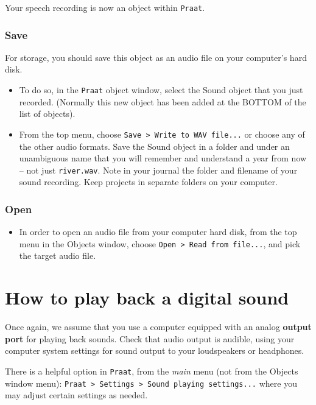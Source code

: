 \documentclass[
]{book}
\providecommand{\tightlist}{%
  \setlength{\itemsep}{0pt}\setlength{\parskip}{0pt}}
\begin{document}
Your speech recording is now an object within \texttt{Praat}.

\subsubsection{Save}\label{sec:praatsave}

For storage, you should save this object as an audio file on your computer's hard disk.

\begin{itemize}
\item
  To do so, in the \texttt{Praat} object window, select the Sound object that you just recorded. (Normally this new object has been added at the BOTTOM of the list of objects).
\item
  From the top menu, choose \texttt{Save\ \textgreater{}\ Write\ to\ WAV\ file...} or choose any of the other audio formats. Save the Sound object in a folder and under an unambiguous name that you will remember and understand a year from now -- not just \texttt{river.wav}. Note in your journal the folder and filename of your sound recording. Keep projects in separate folders on your computer.
\end{itemize}

\subsubsection{Open}\label{sec:praatopen}

\begin{itemize}
\tightlist
\item
  In order to open an audio file from your computer hard disk, from the top menu in the Objects window, choose \texttt{Open\ \textgreater{}\ Read\ from\ file...}, and pick the target audio file.
\end{itemize}

\section{How to play back a digital sound}\label{sec:playback}

Once again, we assume that you use a computer equipped with an analog \textbf{output port} for playing back sounds. Check that audio output is audible, using your computer system settings for sound output to your loudspeakers or headphones.

There is a helpful option in \texttt{Praat}, from the \emph{main} menu (not from the Objects window menu): \texttt{Praat\ \textgreater{}\ Settings\ \textgreater{}\ Sound\ playing\ settings...} where you may adjust certain settings as needed.
\end{document}
